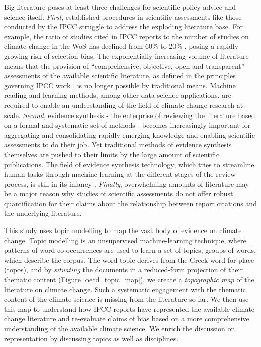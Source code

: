 \documentclass{article}
\begin{document}
\begin{linenumbers}
		Big literature poses at least three challenges for scientific policy advice and science itself: \emph{First}, established procedures in scientific assessments like those conducted by the IPCC struggle to address the exploding literature base. For example, the ratio of studies cited in IPCC reports to the number of studies on climate change in the WoS has declined from 60\% to 20\%  \cite{Minx2017l}, posing a rapidly growing risk of selection bias. The exponentially increasing volume of literature means that the provision of ``comprehensive, objective, open and transparent'' assessments of the available scientific literature, as defined in the principles governing IPCC work \cite{IPCC2013}, is no longer possible by traditional means. 
		Machine reading and learning methods, among other data science applications, are required to enable an understanding of the field of climate change research at scale. 
		\emph{Second}, evidence synthesis - the enterprise of reviewing the literature based on a formal and systematic set of methods \cite{Chalmers2002} - becomes increasingly important for aggregating and consolidating rapidly emerging knowledge and enabling scientific assessments to do their job. 
		Yet traditional methods of evidence synthesis themselves are pushed to their limits by the large amount of scientific publications. The field of evidence synthesis technology, which tries to streamline human tasks through machine learning at the different stages of the review process, is still in its infancy \cite{Beller2018}. \emph{Finally}, overwhelming amounts of literature may be a major reason why studies of scientific assessments \cite{Bjurström2011} do not offer robust quantification for their claims about the relationship between report citations and the underlying literature. 
		
		This study uses topic modelling \cite{Blei2010} to map the vast body of evidence on climate change. Topic modelling is an unsupervised machine-learning technique, where patterns of word co-occurrences are used to learn a set of topics, groups of words, which describe the corpus. 
		The word topic derives from the Greek word for place (topos), and by \textit{situating} the documents in a reduced-form projection of their thematic content (Figure \ref{oecd_topic_map}), we create a \textit{topographic map} of the literature on climate change. Such a systematic engagement with the thematic content of the climate science is missing from the literature so far. 
		We then use this map to understand how IPCC reports have represented the available climate change literature and re-evaluate claims of bias based on a more comprehensive understanding of the available climate science. 
		We enrich the discussion on representation by discussing topics as well as disciplines. 
		

\end{linenumbers}
\end{document}
